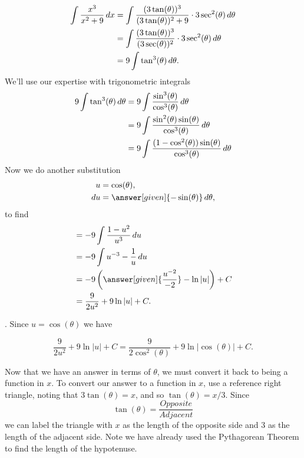 \documentclass{ximera}
\begin{document}
\begin{example}
\begin{explanation}
    \begin{align*}
      \int \frac{x^3}{x^2+9} \mathop{}\!d x &= \int \frac{(3\tan(\theta))^3}{(3\tan(\theta))^2+9} \cdot 3\sec^2(\theta) \mathop{}\!d \theta\\
      &=\int \frac{(3\tan(\theta))^3}{(3\sec(\theta))^2} \cdot 3\sec^2(\theta) \mathop{}\!d \theta\\
      &=9\int \tan^3(\theta)  \mathop{}\!d \theta.
    \end{align*}
    We'll use our expertise with trigonometric integrals
    \begin{align*}
      9\int \tan^3(\theta)  \mathop{}\!d \theta &= 9\int \frac{\sin^3(\theta)}{\cos^{3}(\theta)}  \mathop{}\!d \theta\\
      &= 9\int \frac{\sin^2(\theta) \sin(\theta)}{\cos^{3}(\theta)}  \mathop{}\!d \theta\\
      &= 9\int \frac{(1-\cos^2(\theta)) \sin(\theta)}{\cos^{3}(\theta)}   \mathop{}\!d \theta
    \end{align*}
    Now we do another substitution
    \begin{align*}
      u&=\cos(\theta),\\
      \d u &= \answer[given]{-\sin(\theta)}\d \theta,
    \end{align*}
    to find
    \begin{align*}
      &= -9\int \frac{1-u^2}{u^3}\d u\\
      &= -9\int u^{-3}-\frac{1}{u}\d u\\
      &= -9\left(\answer[given]{\frac{u^{-2}}{-2}}-\ln|u|\right) + C\\
      &= \frac{9}{2u^2} + 9\ln|u| + C.
    \end{align*}

. Since $u = \cos(\theta)$ we have

    \[
    \frac{9}{2u^2} + 9\ln|u| + C = \frac{9}{2\cos^2(\theta)} + 9\ln|\cos(\theta)| + C.
    \]

    Now that we have an answer in terms of $\theta$, we must convert it back to
    being a function in $x$.
    To convert our answer to a function in $x$, use a reference right
    triangle, noting that $3\tan(\theta) = x$, and so $\tan(\theta) =
    x/3$. 
Since 
\[
\tan(\theta)=\frac{Opposite}{Adjacent}
\] 
we can label the triangle with $x$ as the length of the opposite side and $3$ as the length of the adjacent side. Note we have already used the Pythagorean Theorem to 
find the length of the hypotenuse. 


\end{explanation}
\end{example}
\end{document}
